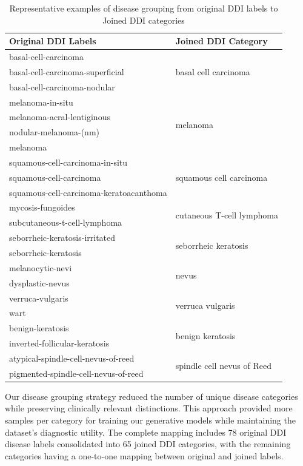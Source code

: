 \documentclass[11pt]{ucthesis}
\begin{document}
\begin{table}[h]
\centering
\caption{Representative examples of disease grouping from original DDI labels to Joined DDI categories}
\label{cgddi:tab:disease_groups}
\begin{tabular}{ll}
\hline
\textbf{Original DDI Labels} & \textbf{Joined DDI Category} \\
\hline
basal-cell-carcinoma & \multirow{3}{*}{basal cell carcinoma} \\
basal-cell-carcinoma-superficial & \\
basal-cell-carcinoma-nodular & \\
\hline
melanoma-in-situ & \multirow{4}{*}{melanoma} \\
melanoma-acral-lentiginous & \\
nodular-melanoma-(nm) & \\
melanoma & \\
\hline
squamous-cell-carcinoma-in-situ & \multirow{3}{*}{squamous cell carcinoma} \\
squamous-cell-carcinoma & \\
squamous-cell-carcinoma-keratoacanthoma & \\
\hline
mycosis-fungoides & \multirow{2}{*}{cutaneous T-cell lymphoma} \\
subcutaneous-t-cell-lymphoma & \\
\hline
seborrheic-keratosis-irritated & \multirow{2}{*}{seborrheic keratosis} \\
seborrheic-keratosis & \\
\hline
melanocytic-nevi & \multirow{2}{*}{nevus} \\
dysplastic-nevus & \\
\hline
verruca-vulgaris & \multirow{2}{*}{verruca vulgaris} \\
wart & \\
\hline
benign-keratosis & \multirow{2}{*}{benign keratosis} \\
inverted-follicular-keratosis & \\
\hline
atypical-spindle-cell-nevus-of-reed & \multirow{2}{*}{spindle cell nevus of Reed} \\
pigmented-spindle-cell-nevus-of-reed & \\
\hline
\end{tabular}
\end{table}

Our disease grouping strategy reduced the number of unique disease categories while preserving clinically relevant distinctions. This approach provided more samples per category for training our generative models while maintaining the dataset's diagnostic utility. The complete mapping includes 78 original DDI disease labels consolidated into 65 joined DDI categories, with the remaining categories having a one-to-one mapping between original and joined labels.
\end{document}
